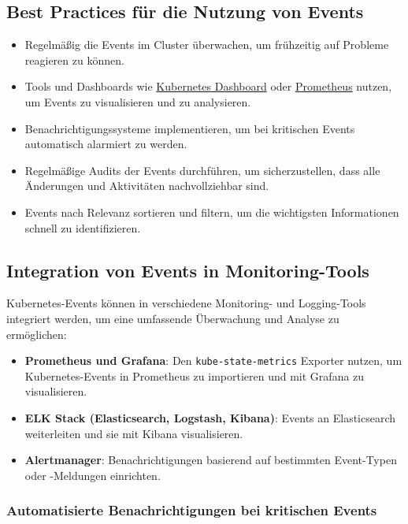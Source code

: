 \subsection{Best Practices für die Nutzung von Events}
\begin{itemize}
    \item Regelmäßig die Events im Cluster überwachen, um frühzeitig auf Probleme reagieren zu können.
    \item Tools und Dashboards wie \href{https://kubernetes.io/docs/tasks/debug/debug-cluster/resource-usage-monitoring/}{Kubernetes Dashboard} oder \href{https://prometheus.io/}{Prometheus} nutzen, um Events zu visualisieren und zu analysieren.
    \item Benachrichtigungssysteme implementieren, um bei kritischen Events automatisch alarmiert zu werden.
    \item Regelmäßige Audits der Events durchführen, um sicherzustellen, dass alle Änderungen und Aktivitäten nachvollziehbar sind.
    \item Events nach Relevanz sortieren und filtern, um die wichtigsten Informationen schnell zu identifizieren.
\end{itemize}

\subsection{Integration von Events in Monitoring-Tools}
Kubernetes-Events können in verschiedene Monitoring- und Logging-Tools integriert werden, um eine umfassende Überwachung und Analyse zu ermöglichen:

\begin{itemize}
    \item \textbf{Prometheus und Grafana}: Den \texttt{kube-state-metrics} Exporter nutzen, um Kubernetes-Events in Prometheus zu importieren und mit Grafana zu visualisieren.
    \item \textbf{ELK Stack (Elasticsearch, Logstash, Kibana)}: Events an Elasticsearch weiterleiten und sie mit Kibana visualisieren.
    \item \textbf{Alertmanager}: Benachrichtigungen basierend auf bestimmten Event-Typen oder -Meldungen einrichten.
\end{itemize}

\subsubsection{Automatisierte Benachrichtigungen bei kritischen Events}




